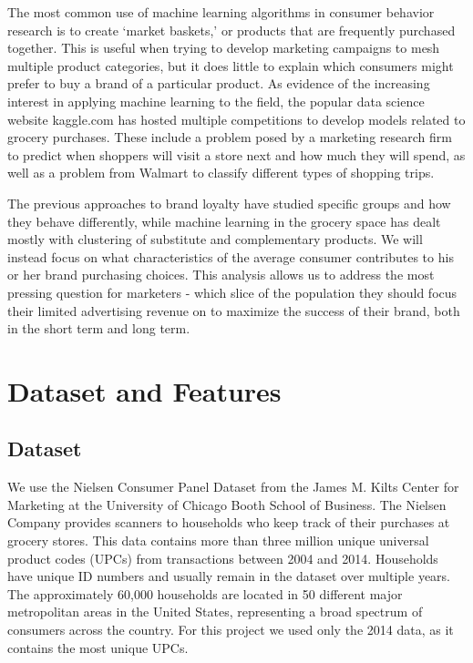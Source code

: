 \documentclass[conference]{IEEEtran}
\begin{document}
The most common use of machine learning algorithms in consumer behavior research is to create ‘market baskets,’ or products that are frequently purchased together. This is useful when trying to develop marketing campaigns to mesh multiple product categories, but it does little to explain which consumers might prefer to buy a brand of a particular product. As evidence of the increasing interest in applying machine learning to the field, the popular data science website kaggle.com has hosted multiple competitions to develop models related to grocery purchases. These include a problem posed by a marketing research firm to predict when shoppers will visit a store next and how much they will spend, as well as a problem from Walmart to classify different types of shopping trips.


The previous approaches to brand loyalty have studied specific groups and how they behave differently, while machine learning in the grocery space has dealt mostly with clustering of substitute and complementary products. We will instead focus on what characteristics of the average consumer contributes to his or her brand purchasing choices. This analysis allows us to address the most pressing question for marketers - which slice of the population they should focus their limited advertising revenue on to maximize the success of their brand, both in the short term and long term.

\section{Dataset and Features}

\subsection{Dataset}
We use the Nielsen Consumer Panel Dataset from the James M. Kilts Center for Marketing at the University of Chicago Booth School of Business. The Nielsen Company provides scanners to households who keep track of their purchases at grocery stores. This data contains more than three million unique universal product codes (UPCs) from transactions between 2004 and 2014. Households have unique ID numbers and usually remain in the dataset over multiple years. The approximately 60,000 households are located in 50 different major metropolitan areas in the United States, representing a broad spectrum of consumers across the country. For this project we used only the 2014 data, as it contains the most unique UPCs.
\end{document}
